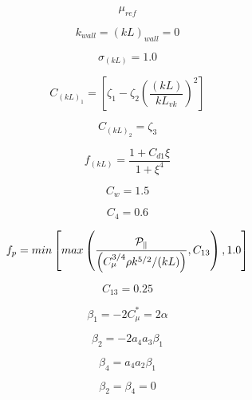 \begin{equation}
\mu_{ref}
\end{equation}

\begin{equation}
k_{wall} = (kL)_{wall} = 0
\end{equation}

\begin{equation}
\sigma_{(kL)} = 1.0
\end{equation}

\begin{equation}
C_{(kL)_1} = \left[ \zeta_1 - \zeta_2 \left( \frac{(kL)}{k L_{vk}} \right)^2 \right]
\end{equation}

\begin{equation}
C_{(kL)_2} = \zeta_3
\end{equation}

\begin{equation}
f_{(kL)} = \frac{1+C_{d1} \xi}{1 + \xi^4}
\end{equation}

\begin{equation}
C_{w} = 1.5
\end{equation}

\begin{equation}
C_4 = 0.6
\end{equation}

\begin{equation}
f_p=min\left[ max\left(\frac{\cal P_k}{\left(C_{\mu}^{3/4} \rho k^{5/2}/(kL) \right)}
 , C_{13} \right) , 1.0 \right]
\end{equation}

\begin{equation}
C_{13} = 0.25
\end{equation}

\begin{equation}
\beta_1 = -2 C_{\mu}^* = 2 \alpha
\end{equation}

\begin{equation}
\beta_2 = -2 a_4 a_3 \beta_1
\end{equation}

\begin{equation}
\beta_4 = a_4 a_2 \beta_1
\end{equation}

\begin{equation}
\beta_2=\beta_4=0
\end{equation}


